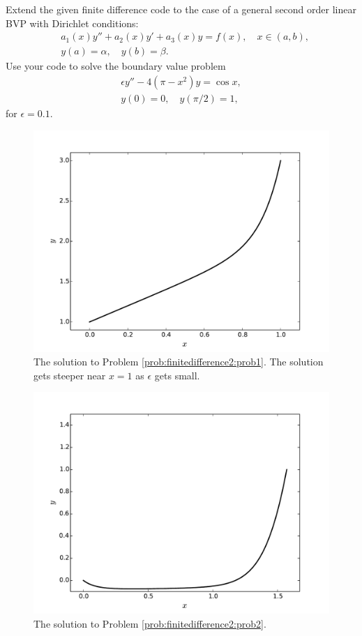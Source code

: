 \begin{problem}
Extend the given finite difference code to the case of a general second order linear BVP with Dirichlet conditions:
\begin{align*}
	&{ } a_1(x)y'' +a_2(x)y'+ a_3(x) y = f(x), \quad x \in (a,b),\\
	&{ } y(a) = \alpha, \quad y(b) = \beta.
\end{align*}
Use your code to solve the boundary value problem
\begin{align*}
	\epsilon y'' - 4(\pi - x^2)y = \cos x, \\
	y(0) = 0, \quad y(\pi/2) = 1,
\end{align*}
for $\epsilon = 0.1$.
\label{prob:finitedifference2:prob2}
\end{problem}

\begin{figure}
\centering
\includegraphics[width=12cm]{figure2.pdf}
\caption{The solution to Problem \ref{prob:finitedifference2:prob1}.
The solution gets steeper near $x = 1$ as $\epsilon $ gets small.}
\end{figure}

\begin{figure}
\centering
\includegraphics[width=12cm]{figure3.pdf}
\caption{The solution to Problem \ref{prob:finitedifference2:prob2}.
}
\end{figure}

